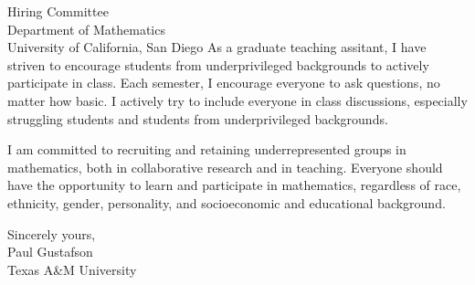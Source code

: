 \documentclass[11pt]{letter} %
\begin{document}
\begin{letter}{Hiring Committee \\
Department of Mathematics \\
University of California, San Diego}
As a graduate teaching assitant, I have striven to encourage students from underprivileged backgrounds to actively participate in class.  Each semester, I encourage everyone to ask questions, no matter how basic.  I actively try to include everyone in class discussions, especially struggling students and students from underprivileged backgrounds.

I am committed to recruiting and retaining underrepresented groups in mathematics, both in collaborative research and in teaching. Everyone should have the opportunity to learn and participate in mathematics, regardless of race, ethnicity, gender, personality, and socioeconomic and educational background.


\closing{Sincerely yours,\\ Paul Gustafson \\ Texas A\&M University}




\end{letter}
\end{document}
